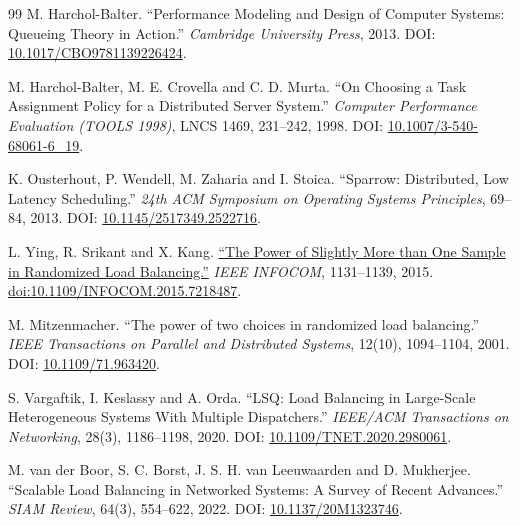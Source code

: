 \documentclass[12pt,a4paper]{article}
\begin{document}
\begin{thebibliography}{99}
 M. Harchol-Balter. ``Performance Modeling and Design of Computer Systems: Queueing Theory in Action.'' \emph{Cambridge University Press}, 2013. DOI: \href{\detokenize{https://doi.org/10.1017/CBO9781139226424}}{10.1017/CBO9781139226424}.

 M. Harchol-Balter, M. E. Crovella and C. D. Murta. ``On Choosing a Task Assignment Policy for a Distributed Server System.'' \emph{Computer Performance Evaluation (TOOLS 1998)}, LNCS 1469, 231--242, 1998. DOI: \href{\detokenize{https://www.cs.cmu.edu/~harchol/Papers/tools.pdf}}{10.1007/3-540-68061-6\_19}.

 K. Ousterhout, P. Wendell, M. Zaharia and I. Stoica. ``Sparrow: Distributed, Low Latency Scheduling.'' \emph{24th ACM Symposium on Operating Systems Principles}, 69--84, 2013. DOI: \href{\detokenize{https://sigops.org/s/conferences/sosp/2013/papers/p69-ousterhout.pdf}}{10.1145/2517349.2522716}.

 L. Ying, R. Srikant and X. Kang. \href{\detokenize{https://bpb-us-w2.wpmucdn.com/sites.coecis.cornell.edu/dist/9/287/files/2019/08/Srikant-1-YinSriKan14tech.pdf}}{``The Power of Slightly More than One Sample in Randomized Load Balancing.''} \emph{IEEE INFOCOM}, 1131--1139, 2015. \href{\detokenize{https://doi.org/10.1109/INFOCOM.2015.7218487}}{doi:10.1109/INFOCOM.2015.7218487}.

 M. Mitzenmacher. ``The power of two choices in randomized load balancing.'' \emph{IEEE Transactions on Parallel and Distributed Systems}, 12(10), 1094--1104, 2001. DOI: \href{\detokenize{https://doi.org/10.1109/71.963420}}{10.1109/71.963420}.

 S. Vargaftik, I. Keslassy and A. Orda. ``LSQ: Load Balancing in Large-Scale Heterogeneous Systems With Multiple Dispatchers.'' \emph{IEEE/ACM Transactions on Networking}, 28(3), 1186--1198, 2020. DOI: \href{\detokenize{https://webee.technion.ac.il/~isaac/p/ton20_lsq.pdf}}{10.1109/TNET.2020.2980061}.

 M. van der Boor, S. C. Borst, J. S. H. van Leeuwaarden and D. Mukherjee. ``Scalable Load Balancing in Networked Systems: A Survey of Recent Advances.'' \emph{SIAM Review}, 64(3), 554--622, 2022. DOI: \href{\detokenize{https://doi.org/10.1137/20M1323746}}{10.1137/20M1323746}.


\end{thebibliography}
\end{document}
